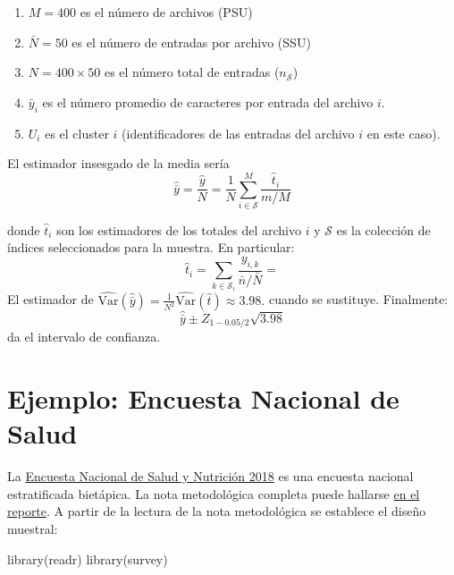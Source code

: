 \documentclass[
]{book}
\newenvironment{Shaded}{\begin{snugshade}}{\end{snugshade}}
\newcommand{\FunctionTok}[1]{\textcolor[rgb]{0.00,0.00,0.00}{#1}}
\newcommand{\NormalTok}[1]{#1}
\begin{document}
\begin{enumerate}
\def\labelenumi{\alph{enumi}.}
\item
  \(M = 400\) es el número de archivos (PSU)
\item
  \(\bar{N} = 50\) es el número de entradas por archivo (SSU)
\item
  \(N = 400 \times 50\) es el número total de entradas (\(n_{\mathcal{S}}\))
\item
  \(\bar{y}_i\) es el número promedio de caracteres por entrada del archivo \(i\).
\item
  \(U_i\) es el cluster \(i\) (identificadores de las entradas del archivo \(i\) en este caso).
\end{enumerate}

El estimador insesgado de la media sería
\[
\hat{\bar{y}} = \dfrac{\hat{y}}{N} = \dfrac{1}{N} \sum\limits_{i \in \mathcal{S}}^M \dfrac{\hat{t}_i }{m/M}
\]

donde \(\hat{t}_i\) son los estimadores de los totales del archivo \(i\) y \(\mathcal{S}\) es la colección de índices seleccionados para la muestra. En particular:
\[
\hat{t}_i =\sum_{k \in \mathcal{S}_i} \dfrac{y_{i,k} }{\bar{n}/\bar{N}} = 
\]
El estimador de \(\widehat{\textrm{Var}}(\hat{\bar{y}}) = \frac{1}{N^2}\widehat{\text{Var}}(\hat{t}) \approx 3.98.\) cuando se sustituye. Finalmente:
\[
\hat{\bar{y}} \pm Z_{1 - 0.05/2}\sqrt{3.98}
\]
da el intervalo de confianza.

\hypertarget{ejemplo-encuesta-nacional-de-salud}{%
\section{Ejemplo: Encuesta Nacional de Salud}\label{ejemplo-encuesta-nacional-de-salud}}

La \href{https://ensanut.insp.mx/encuestas/ensanut2018/descargas.php}{Encuesta Nacional de Salud y Nutrición 2018} es una encuesta nacional estratificada bietápica. La nota metodológica completa puede hallarse \href{https://ensanut.insp.mx/encuestas/ensanut2018/doctos/metodologia/ensanut_2018_diseno_muestral.pdf}{en el reporte}. A partir de la lectura de la nota metodológica se establece el diseño muestral:

\begin{Shaded}
\begin{Highlighting}[]
\FunctionTok{library}\NormalTok{(readr)}
\FunctionTok{library}\NormalTok{(survey)}
\end{Highlighting}
\end{Shaded}
\end{document}
